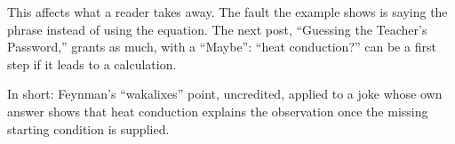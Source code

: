 \begin{afterword}
This affects what a reader takes away. The fault the example shows is saying the phrase instead of using the equation. The next post, ``Guessing the Teacher's Password,'' grants as much, with a ``Maybe'': ``heat conduction?'' can be a first step if it leads to a calculation.

In short: Feynman's ``wakalixes'' point, uncredited, applied to a joke whose own answer shows that heat conduction explains the observation once the missing starting condition is supplied.
\end{afterword}
